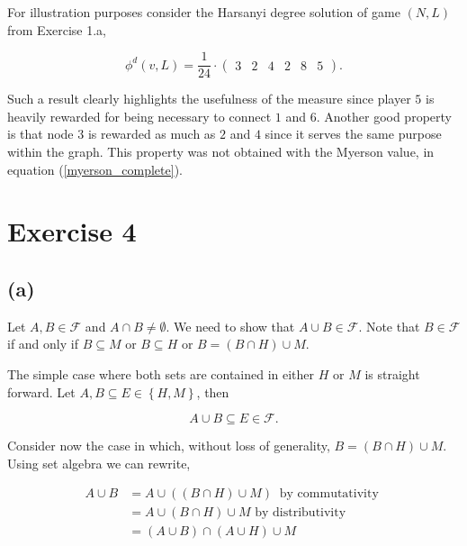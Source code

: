 \documentclass[american]{scrartcl}
\newcommand{\set}[1]{\left\{#1\right\}}
\begin{document}
For illustration purposes consider the Harsanyi degree solution of game $(N, L)$ from Exercise 1.a,

\begin{equation}
    \phi^d(v, L) =
    \frac{1}{24} \cdot \begin{pmatrix}
        3 &
        2 &
        4 &
        2 &
        8 &
        5
    \end{pmatrix}.
\end{equation}

Such a result clearly highlights the usefulness of the measure since player $5$ is heavily rewarded for being necessary to connect $1$ and $6$. Another good property is that node $3$ is rewarded as much as $2$ and $4$ since it serves the same purpose within the graph. This property was not obtained with the Myerson value, in equation (\ref{myerson_complete}).

\section*{Exercise 4}

\subsection*{(a)}

Let $A, B \in \mathcal{F}$ and $A \cap B \neq \emptyset$. We need to show that $A \cup B \in \mathcal{F}$. Note that $B \in \mathcal{F}$ if and only if $B \subseteq M$ or $B \subseteq H$ or $B = (B \cap H) \cup M$.

The simple case where both sets are contained in either $H$ or $M$ is straight forward. Let $A, B \subseteq E \in \set{H, M}$, then

\begin{equation}
    A \cup B \subseteq E \in \mathcal{F}.
\end{equation}


Consider now the case in which, without loss of generality, $B = (B \cap H) \cup M$. Using set algebra we can rewrite,

\begin{equation} \label{gen_set}
    \begin{split}
        A \cup B &= A \cup ((B \cap H) \cup M) \ \text{ by commutativity } \\
        &= A \cup (B \cap H) \cup M \text{ by distributivity } \\
        &= (A \cup B) \cap (A \cup H) \cup M
    \end{split}
\end{equation}
\end{document}
